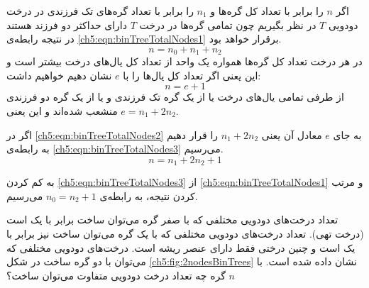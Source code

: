 اگر {$n$} را برابر با تعداد کل گره‌ها و {$n_1$} را برابر با تعداد گره‌های تک فرزندی در درخت دودویی {$T$} در نظر بگیریم چون تمامی گره‌ها در درخت {$T$} دارای حداکثر دو فرزند هستند در نتیجه رابطه‌ی {\eqref{ch5:eqn:binTreeTotalNodes1}} برقرار خواهد بود.
\begin{equation}
n = n_0 + n_1 + n_2\label{ch5:eqn:binTreeTotalNodes1}
\end{equation}
در هر درخت تعداد کل گره‌ها همواره یک واحد از تعداد کل یال‌های درخت بیشتر است و این یعنی اگر تعداد کل یال‌ها را با {$e$} نشان دهیم خواهیم داشت:
\begin{equation}
n=e+1\label{ch5:eqn:binTreeTotalNodes2}
\end{equation}
از طرفی تمامی یال‌های درخت یا از یک گره تک فرزندی و یا از یک گره دو فرزندی منشعب شده‌اند و این یعنی {$e=n_1+2n_2$}. 

اگر در {\eqref{ch5:eqn:binTreeTotalNodes2}} به جای {$e$} معادل آن یعنی {$n_1+2n_2$} را قرار دهیم به رابطه‌ی {\eqref{ch5:eqn:binTreeTotalNodes3}} می‌رسیم.
\begin{equation}
n=n_1+2n_2+1\label{ch5:eqn:binTreeTotalNodes3}
\end{equation}

به کم کردن {\eqref{ch5:eqn:binTreeTotalNodes3}} از {\eqref{ch5:eqn:binTreeTotalNodes1}} و مرتب کردن نتیجه، به رابطه‌ی {$n_0=n_2+1$} می‌رسیم.


 تعداد درخت‌های دودویی مختلفی که با صفر گره می‌توان ساخت برابر با یک است (درخت تهی). تعداد درخت‌های دودویی مختلفی که با یک گره می‌توان ساخت نیز برابر با یک است و چنین درختی فقط دارای عنصر ریشه است. درخت‌های دودویی مختلفی که می‌توان با دو گره ساخت در شکل {\eqref{ch5:fig:2nodesBinTrees}} نشان داده شده است. با {$n$} گره چه تعداد درخت دودویی متفاوت می‌توان ساخت؟


